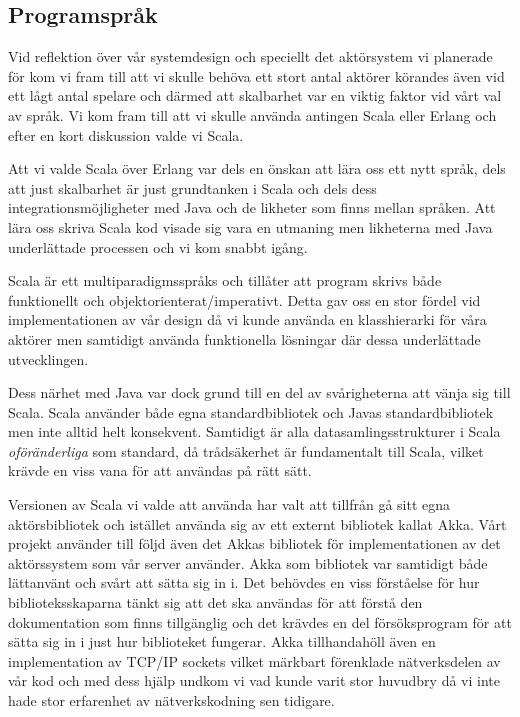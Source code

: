 \documentclass[a4paper]{article}
\begin{document}
\subsection{Programspråk}
Vid reflektion över vår systemdesign och speciellt det aktörsystem vi planerade för kom vi fram till att vi skulle behöva
ett stort antal aktörer körandes även vid ett lågt antal spelare och därmed att skalbarhet var en viktig faktor vid vårt
val av språk. Vi kom fram till att vi skulle använda antingen Scala eller Erlang och efter en kort diskussion valde vi Scala.

Att vi valde Scala över Erlang var dels en önskan att lära oss ett nytt språk, dels att just skalbarhet är just grundtanken
i Scala och dels dess integrationsmöjligheter med Java och de likheter som finns mellan språken. Att lära oss skriva Scala kod
visade sig vara en utmaning men likheterna med Java underlättade processen och vi kom snabbt igång.

Scala är ett multiparadigmsspråks och tillåter att program skrivs både funktionellt och objektorienterat/imperativt. Detta gav oss en stor
fördel vid implementationen av vår design då vi kunde använda en klasshierarki för våra aktörer men samtidigt använda 
funktionella lösningar där dessa underlättade utvecklingen.

Dess närhet med Java var dock grund till en del av svårigheterna att vänja sig till Scala. Scala använder både egna standardbibliotek
och Javas standardbibliotek men inte alltid helt konsekvent. Samtidigt är alla datasamlingsstrukturer i Scala \textit{oföränderliga} 
som standard, då trådsäkerhet är fundamentalt till Scala, vilket krävde en viss vana för att användas på rätt sätt.

Versionen av Scala vi valde att använda har valt att tillfrån gå sitt egna aktörsbibliotek och istället använda sig av ett externt
bibliotek kallat Akka. Vårt projekt använder till följd även det Akkas bibliotek för implementationen av det aktörssystem som
vår server använder. Akka som bibliotek var samtidigt både lättanvänt och svårt att sätta sig in i. Det behövdes en viss förståelse
för hur biblioteksskaparna tänkt sig att det ska användas för att förstå den dokumentation som finns tillgänglig och det krävdes
en del försöksprogram för att sätta sig in i just hur biblioteket fungerar. Akka tillhandahöll även en implementation av TCP/IP
sockets vilket märkbart förenklade nätverksdelen av vår kod och med dess hjälp undkom vi vad kunde varit stor huvudbry då vi inte
hade stor erfarenhet av nätverkskodning sen tidigare.
\end{document}
